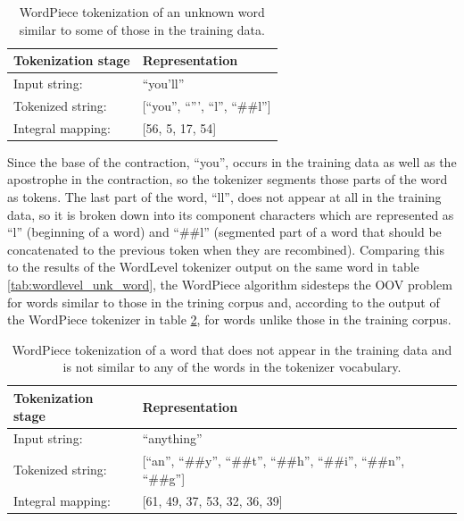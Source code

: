 \documentclass[12pt]{article}
\begin{document}
\begin{table}[h!]
    \centering
    \begin{tabular}{l l}
        \toprule
        Tokenization stage & Representation                     \\
        \midrule
        Input string:      & ``you'll''                         \\
        Tokenized string:  & [``you'', ``''', ``l'', ``\#\#l''] \\
        Integral mapping:  & [56, 5, 17, 54]                    \\
        \bottomrule
    \end{tabular}
    \caption{WordPiece tokenization of an unknown word similar to some of those in the training data.}
    \label{tab:wordpiece_unk_word_similar}
\end{table}

\noindent
Since the base of the contraction, ``you'', occurs in the training data as well as the apostrophe in the contraction, so the tokenizer segments those
parts of the word as tokens. The last part of the word, ``ll'', does not appear at all in the training data, so it is broken down into its component
characters which are represented as ``l'' (beginning of a word) and ``\#\#l'' (segmented part of a word that should be concatenated to the previous
token when they are recombined). Comparing this to the results of the WordLevel tokenizer output on the same word in table
\ref{tab:wordlevel_unk_word}, the WordPiece algorithm sidesteps the OOV problem for words similar to those in the trining corpus and, according to
the output of the WordPiece tokenizer in table \ref{tab:wordpiece_unk_word}, for words unlike those in the training corpus.

\begin{table}[h!]
    \centering
    \begin{tabular}{l l}
        \toprule
        Tokenization stage & Representation                                                             \\
        \midrule
        Input string:      & ``anything''                                                               \\
        Tokenized string:  & [``an'', ``\#\#y'', ``\#\#t'', ``\#\#h'', ``\#\#i'', ``\#\#n'', ``\#\#g''] \\
        Integral mapping:  & [61, 49, 37, 53, 32, 36, 39]                                               \\
        \bottomrule
    \end{tabular}
    \caption{WordPiece tokenization of a word that does not appear in the training data and is not similar to any of the words in the tokenizer
        vocabulary.}
    \label{tab:wordpiece_unk_word}
\end{table}
\end{document}
